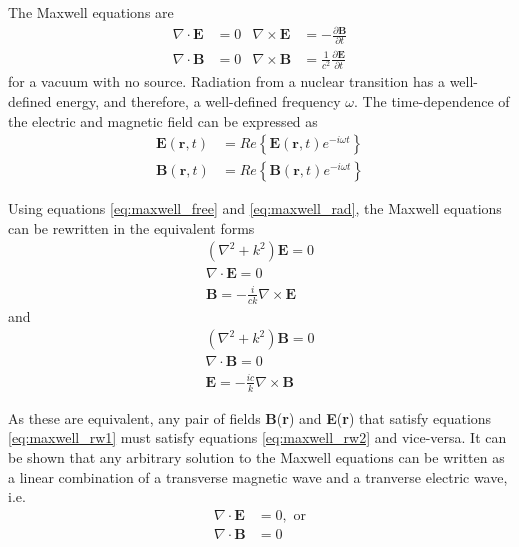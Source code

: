 The Maxwell equations are
\begin{subequations}
\label{eq:maxwell_free}
\begin{align}
    \nabla \cdot \textbf{E} & = 0 &   \nabla \times \textbf{E} & = -\frac{\partial \textbf{B}}{\partial t} \\
     \nabla \cdot \textbf{B} & = 0 &  \nabla \times \textbf{B} & = \frac{1}{c^2}\frac{\partial \textbf{E}}{\partial t}
\end{align}
\end{subequations}
for a vacuum with no source. Radiation from a nuclear transition has a well-defined energy, and therefore, a well-defined frequency $\omega$. The time-dependence of the electric and magnetic field can be expressed as
\begin{subequations}
\label{eq:maxwell_rad}
\begin{align}
    \textbf{E}(\textbf{r},t) & = Re\left\{\textbf{E}(\textbf{r},t)e^{-i\omega t}\right\} \\
    \textbf{B}(\textbf{r},t) & = Re\left\{\textbf{B}(\textbf{r},t)e^{-i\omega t}\right\}
\end{align}
\end{subequations}
 
Using equations \ref{eq:maxwell_free} and \ref{eq:maxwell_rad}, the Maxwell equations can be rewritten in the equivalent forms
\begin{subequations}
\label{eq:maxwell_rw1}
\begin{gather}
    \left(\nabla^2+k^2\right)\textbf{E} = 0 \\
    \nabla \cdot \textbf{E} = 0 \\
    \textbf{B}=-\frac{i}{ck} \nabla \times \textbf{E}
\end{gather}
\end{subequations}
and
\begin{subequations}
\label{eq:maxwell_rw2}
\begin{gather}
    \left(\nabla^2+k^2\right)\textbf{B} = 0 \\
    \nabla \cdot \textbf{B} = 0 \\
    \textbf{E}=-\frac{ic}{k} \nabla \times \textbf{B}
\end{gather}
\end{subequations}

As these are equivalent, any pair of fields \textbf{B}(\textbf{r}) and \textbf{E}(\textbf{r}) that satisfy equations \ref{eq:maxwell_rw1} must satisfy equations \ref{eq:maxwell_rw2} and vice-versa. It can be shown that any arbitrary solution to the Maxwell equations can be written as a linear combination of a transverse magnetic wave and a tranverse electric wave, i.e. 
\begin{align}
    \label{eq:trans_E}
    \nabla \cdot \textbf{E} & = 0, \text{ or} \\
    \label{eq:trans_B}
    \nabla \cdot \textbf{B} & = 0
\end{align}


